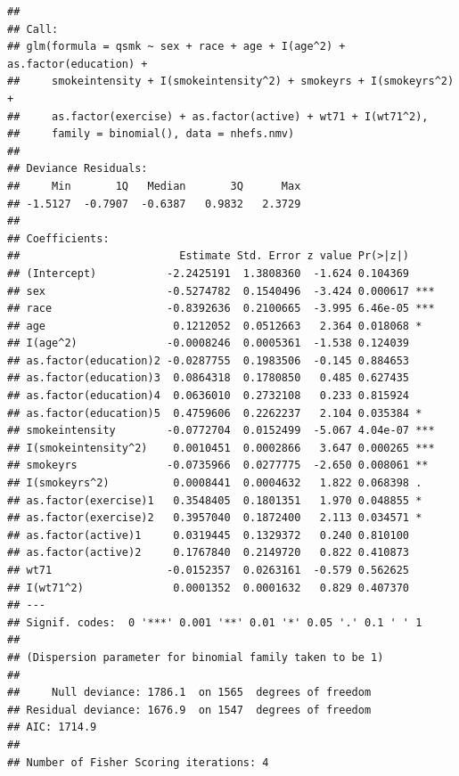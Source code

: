 \documentclass[
  10pt,
]{book}
\newenvironment{Shaded}{\begin{snugshade}}{\end{snugshade}}
\newcommand{\DataTypeTok}[1]{\textcolor[rgb]{0.13,0.29,0.53}{#1}}
\newcommand{\DecValTok}[1]{\textcolor[rgb]{0.00,0.00,0.81}{#1}}
\newcommand{\KeywordTok}[1]{\textcolor[rgb]{0.13,0.29,0.53}{\textbf{#1}}}
\newcommand{\NormalTok}[1]{#1}
\newcommand{\OperatorTok}[1]{\textcolor[rgb]{0.81,0.36,0.00}{\textbf{#1}}}
\newcommand{\StringTok}[1]{\textcolor[rgb]{0.31,0.60,0.02}{#1}}
\begin{document}
\begin{verbatim}
## 
## Call:
## glm(formula = qsmk ~ sex + race + age + I(age^2) + as.factor(education) + 
##     smokeintensity + I(smokeintensity^2) + smokeyrs + I(smokeyrs^2) + 
##     as.factor(exercise) + as.factor(active) + wt71 + I(wt71^2), 
##     family = binomial(), data = nhefs.nmv)
## 
## Deviance Residuals: 
##     Min       1Q   Median       3Q      Max  
## -1.5127  -0.7907  -0.6387   0.9832   2.3729  
## 
## Coefficients:
##                         Estimate Std. Error z value Pr(>|z|)    
## (Intercept)           -2.2425191  1.3808360  -1.624 0.104369    
## sex                   -0.5274782  0.1540496  -3.424 0.000617 ***
## race                  -0.8392636  0.2100665  -3.995 6.46e-05 ***
## age                    0.1212052  0.0512663   2.364 0.018068 *  
## I(age^2)              -0.0008246  0.0005361  -1.538 0.124039    
## as.factor(education)2 -0.0287755  0.1983506  -0.145 0.884653    
## as.factor(education)3  0.0864318  0.1780850   0.485 0.627435    
## as.factor(education)4  0.0636010  0.2732108   0.233 0.815924    
## as.factor(education)5  0.4759606  0.2262237   2.104 0.035384 *  
## smokeintensity        -0.0772704  0.0152499  -5.067 4.04e-07 ***
## I(smokeintensity^2)    0.0010451  0.0002866   3.647 0.000265 ***
## smokeyrs              -0.0735966  0.0277775  -2.650 0.008061 ** 
## I(smokeyrs^2)          0.0008441  0.0004632   1.822 0.068398 .  
## as.factor(exercise)1   0.3548405  0.1801351   1.970 0.048855 *  
## as.factor(exercise)2   0.3957040  0.1872400   2.113 0.034571 *  
## as.factor(active)1     0.0319445  0.1329372   0.240 0.810100    
## as.factor(active)2     0.1767840  0.2149720   0.822 0.410873    
## wt71                  -0.0152357  0.0263161  -0.579 0.562625    
## I(wt71^2)              0.0001352  0.0001632   0.829 0.407370    
## ---
## Signif. codes:  0 '***' 0.001 '**' 0.01 '*' 0.05 '.' 0.1 ' ' 1
## 
## (Dispersion parameter for binomial family taken to be 1)
## 
##     Null deviance: 1786.1  on 1565  degrees of freedom
## Residual deviance: 1676.9  on 1547  degrees of freedom
## AIC: 1714.9
## 
## Number of Fisher Scoring iterations: 4
\end{verbatim}

\begin{Shaded}
\end{Shaded}
\end{document}
